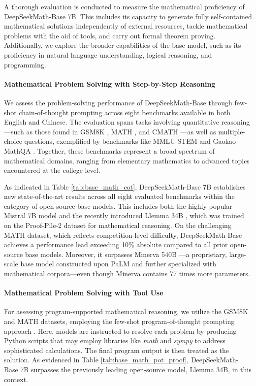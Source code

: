 A thorough evaluation is conducted to measure the mathematical proficiency of DeepSeekMath-Base 7B. This includes its capacity to generate fully self-contained mathematical solutions independently of external resources, tackle mathematical problems with the aid of tools, and carry out formal theorem proving. Additionally, we explore the broader capabilities of the base model, such as its proficiency in natural language understanding, logical reasoning, and programming.

\paragraph{Mathematical Problem Solving with Step-by-Step Reasoning}

We assess the problem-solving performance of DeepSeekMath-Base through few-shot chain-of-thought prompting \citep{cot} across eight benchmarks available in both English and Chinese. The evaluation spans tasks involving quantitative reasoning—such as those found in GSM8K \citep{gsm8k}, MATH \citep{MATH}, and CMATH \citep{wei2023cmath}—as well as multiple-choice questions, exemplified by benchmarks like MMLU-STEM \citep{mmlu} and Gaokao-MathQA \citep{agieval}. Together, these benchmarks represent a broad spectrum of mathematical domains, ranging from elementary mathematics to advanced topics encountered at the college level.

As indicated in Table \ref{tab:base_math_cot}, DeepSeekMath-Base 7B establishes new state-of-the-art results across all eight evaluated benchmarks within the category of open-source base models. This includes both the highly popular Mistral 7B model \citep{mistral} and the recently introduced Llemma 34B \citep{llemma}, which was trained on the Proof-Pile-2 dataset \citep{llemma} for mathematical reasoning. On the challenging MATH dataset, which reflects competition-level difficulty, DeepSeekMath-Base achieves a performance lead exceeding 10\% absolute compared to all prior open-source base models. Moreover, it surpasses Minerva 540B \citep{minerva}—a proprietary, large-scale base model constructed upon PaLM \citep{palm} and further specialized with mathematical corpora—even though Minerva contains 77 times more parameters.

\paragraph{Mathematical Problem Solving with Tool Use} For assessing program-supported mathematical reasoning, we utilize the GSM8K and MATH datasets, employing the few-shot program-of-thought prompting approach \citep{pot,pal}. Here, models are instructed to resolve each problem by producing Python scripts that may employ libraries like \textit{math} and \textit{sympy} to address sophisticated calculations. The final program output is then treated as the solution. As evidenced in Table \ref{tab:base_math_pot_proof}, DeepSeekMath-Base 7B surpasses the previously leading open-source model, Llemma 34B, in this context.

